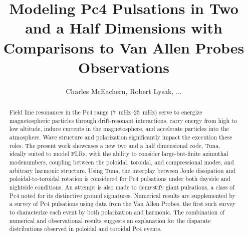 \documentclass[jgrga]{agutex}
\begin{document}
\title{Modeling Pc4 Pulsations in Two and a Half Dimensions with
       Comparisons to Van Allen Probes Observations}
\author{Charles McEachern, Robert Lysak, ...}


\linespread{2}


\begin{abstract}

Field line resonances in the Pc4 range (\SIrange{7}{25}{\mHz}) serve
to energize magnetospheric particles through drift-resonant
interactions, carry energy from high to low altitude, induce currents in
the magnetosphere, and accelerate particles into the atmosphere. Wave
structure and polarization significantly impact the execution these
roles. The present work showcases a new two and a half dimensional code,
Tuna, ideally suited to model FLRs, with the ability to consider
large-but-finite azimuthal modenumbers, coupling between the poloidal,
toroidal, and compressional modes, and arbitrary harmonic structure.
Using Tuna, the interplay between Joule dissipation and
poloidal-to-toroidal rotation is considered for Pc4 pulsations under
both dayside and nightside conditions. An attempt is also made to
demystify giant pulsations, a class of Pc4 noted for its distinctive
ground signatures. Numerical results are supplemented by a survey of
 Pc4 pulsations using data from the Van Allen Probes, the first
such survey to characterize each event by both polarization and
harmonic. The combination of numerical and observational results
suggests an explanation for the disparate distributions observed in
poloidal and toroidal Pc4 events. 

\end{abstract}
\end{document}
